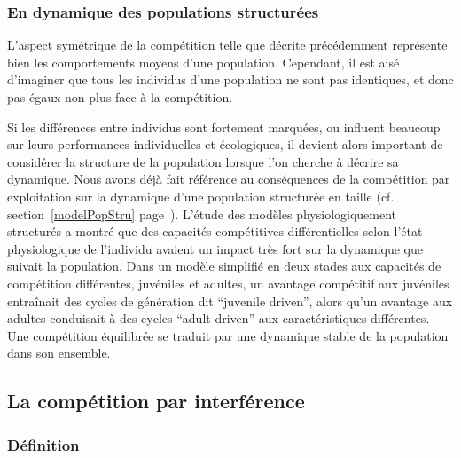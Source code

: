 \subsubsection{En dynamique des populations structurées}

L'aspect symétrique de la compétition telle que décrite précédemment représente
bien les comportements moyens d'une population. Cependant, il est aisé
d'imaginer que tous les individus d'une population ne sont pas identiques, et
donc pas égaux non plus face à la compétition. 

Si les différences entre individus sont fortement marquées, ou influent
beaucoup sur leurs performances individuelles et écologiques, il devient alors
important de considérer la structure de la population lorsque l'on cherche à
décrire sa dynamique. Nous avons déjà fait référence au conséquences de la
compétition par exploitation sur la dynamique d'une population structurée en
taille (cf. section~\ref{modelPopStru} page~\pageref{modelPopStru}). L'étude
des modèles physiologiquement structurés a montré que des capacités compétitives différentielles selon l'état
physiologique de l'individu avaient un impact très fort sur la dynamique que
suivait la population. Dans un modèle simplifié en deux stades aux capacités de
compétition différentes, juvéniles et adultes, un avantage compétitif aux
juvéniles entraînait des cycles de génération dit ``juvenile driven'', alors
qu'un avantage aux adultes conduisait à des cycles ``adult driven'' aux caractéristiques
différentes. Une compétition équilibrée se traduit par une dynamique stable de
la population dans son ensemble. 


\subsection{La compétition par interférence}

\subsubsection{Définition}

